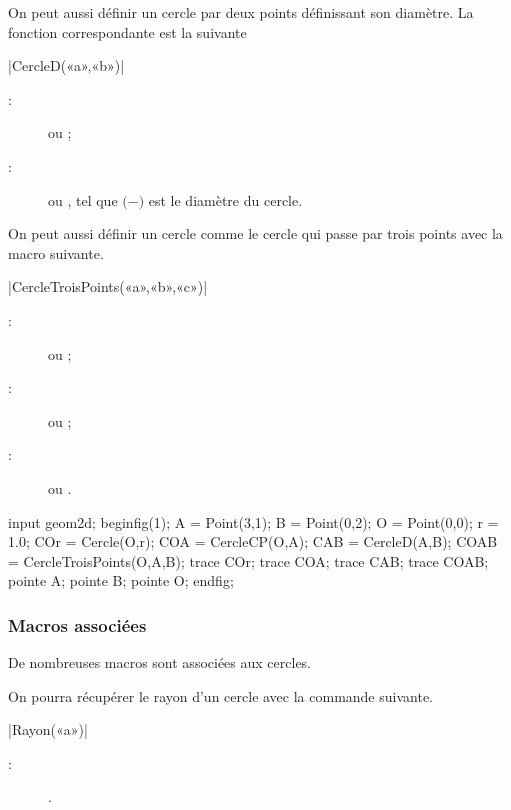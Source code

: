 \documentclass[a4paper,french]{article}
\begin{document}
On peut aussi définir un cercle par deux points définissant son diamètre. La
fonction correspondante est la suivante

\begin{colourband}
\macro|CercleD(«a»,«b»)|
\begin{description}
  \item[:]   ou  ;
  \item[:]   ou ,
  tel que $($$-$$)$ est le diamètre du cercle.
\end{description}
\end{colourband}
\bigskip

On peut aussi définir un cercle comme le cercle qui passe par trois points avec
la macro suivante.

\begin{colourband}
\macro|CercleTroisPoints(«a»,«b»,«c»)|
\begin{description}
  \item[:]   ou  ;
  \item[:]   ou  ;
  \item[:]   ou .
\end{description}
\end{colourband}
\bigskip




\begin{ExempleMP}
input geom2d;
beginfig(1);
A = Point(3,1);
B = Point(0,2);
O = Point(0,0);
r = 1.0;
COr = Cercle(O,r);
COA = CercleCP(O,A);
CAB = CercleD(A,B);
COAB = CercleTroisPoints(O,A,B);
trace COr;
trace COA;
trace CAB;
trace COAB;
pointe A; pointe B; pointe O;
endfig;
\end{ExempleMP}

\subsubsection{Macros associées}

De nombreuses macros sont associées aux cercles.

On pourra récupérer le rayon d'un cercle avec la commande suivante.


\begin{colourband}
\macro|Rayon(«a»)|
\begin{description}
  \item[:]  .
\end{description}
\end{colourband}
\bigskip
\end{document}
